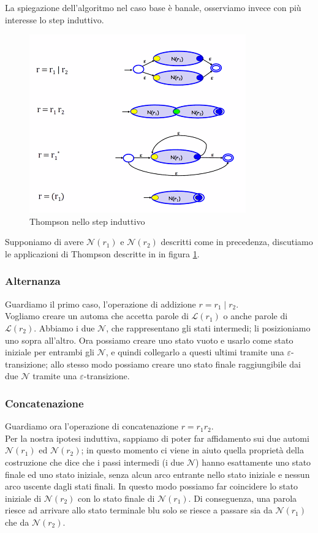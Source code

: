\documentclass[class=book, crop=false, oneside, 12pt]{standalone}
\begin{document}
\noindent La spiegazione dell'algoritmo nel caso base è banale, osserviamo invece con più interesse lo step induttivo.

\begin{figure}
    \centering
    \includegraphics[width=.7\textwidth,keepaspectratio]{Thompson_step}
    \caption{Thompson nello step induttivo}
    \label{Thompson_step}
\end{figure}
Supponiamo di avere \(\mathcal{N}(r_1)\) e \(\mathcal{N}(r_2)\) descritti come in precedenza, discutiamo le applicazioni di Thompson descritte in in figura \ref{Thompson_step}.

\subsubsection{Alternanza}
Guardiamo il primo caso, l'operazione di addizione \(r = r_1 \mid r_2\).\\
Vogliamo creare un automa che accetta parole di \(\mathcal{L}(r_1)\) o anche parole di \(\mathcal{L}(r_2)\).
Abbiamo i due \(\mathcal{N}\), che rappresentano gli stati intermedi; li posizioniamo uno sopra all’altro. Ora possiamo creare uno stato vuoto e usarlo come stato iniziale per entrambi gli \(\mathcal{N}\), e quindi collegarlo a questi ultimi tramite una \(\varepsilon\)-transizione; allo stesso modo possiamo creare uno stato finale raggiungibile dai due \(\mathcal{N}\) tramite una \(\varepsilon\)-transizione.

\subsubsection{Concatenazione}
Guardiamo ora l’operazione di concatenazione \(r = r_1 r_2\).\\
Per la nostra ipotesi induttiva, sappiamo di poter far affidamento sui due automi \(\mathcal{N}(r_1)\) ed \(\mathcal{N}(r_2)\); in questo momento ci viene in aiuto quella proprietà della costruzione che dice che i passi intermedi (i due \(\mathcal{N}\)) hanno esattamente uno stato finale ed uno stato iniziale, senza alcun arco entrante nello stato iniziale e nessun arco uscente dagli stati finali. 
In questo modo possiamo far coincidere lo stato iniziale di \(\mathcal{N}(r_2)\) con lo stato finale di \(\mathcal{N}(r_1)\). 
Di conseguenza, una parola riesce ad arrivare allo stato terminale blu solo se riesce a passare sia da \(\mathcal{N}(r_1)\) che da \(\mathcal{N}(r_2)\).
\end{document}
